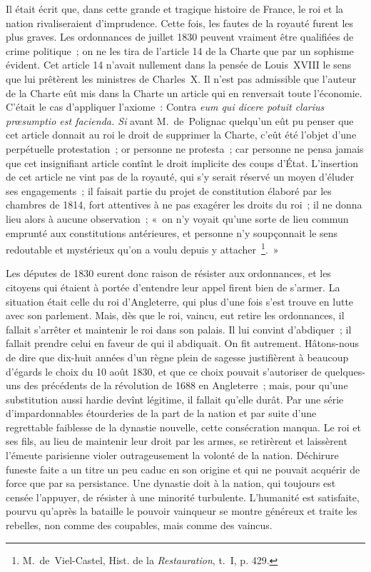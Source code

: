 \documentclass[french,twoside]{book} %
\begin{document}
Il était écrit que, dans cette grande et tragique histoire de France, le roi et la nation rivaliseraient d’imprudence. Cette fois, les fautes de la royauté furent les plus graves. Les ordonnances de juillet 1830 peuvent vraiment être qualifiées de crime politique ; on ne les tira de l’article 14 de la Charte que par un sophisme évident. Cet article 14 n’avait nullement dans la pensée de Louis XVIII le sens que lui prêtèrent les ministres de Charles X. Il n’est pas admissible que l’auteur de la Charte eût mis dans la Charte un article qui en renversait toute l’économie. C’était le cas d’appliquer l’axiome : Contra {\itshape eum qui dicere potuit clarius prœsumptio est facienda. Si} avant M. de Polignac quelqu’un eût pu penser que cet article donnait au roi le droit de supprimer la Charte, c’eût été l’objet d’une perpétuelle protestation ; or personne ne protesta ; car personne ne pensa jamais que cet insignifiant article contînt le droit implicite des coups d’État. L’insertion de cet article ne vint pas de la royauté, qui s’y serait réservé un moyen d’éluder ses engagements ; il faisait partie du projet de constitution élaboré par les chambres de 1814, fort attentives à ne pas exagérer les droits du roi ; il ne donna lieu alors à aucune observation ; « on n’y voyait qu’une sorte de lieu commun emprunté aux constitutions antérieures, et personne n’y soupçonnait le sens redoutable et mystérieux qu’on a voulu depuis y attacher \footnote{ M. de Viel-Castel, Hist. de la {\itshape Restauration}, t. I, p. 429.}. » \par
Les députes de 1830 eurent donc raison de résister aux ordonnances, et les citoyens qui étaient à portée d’entendre leur appel firent bien de s’armer. La situation était celle du roi d’Angleterre, qui plus d’une fois s’est trouve en lutte avec son parlement. Mais, dès que le roi, vaincu, eut retire les ordonnances, il fallait s’arrêter et maintenir le roi dans son palais. Il lui convint d’abdiquer ; il fallait prendre celui en faveur de qui il abdiquait. On fit autrement. Hâtons-nous de dire que dix-huit années d’un règne plein de sagesse justifièrent à beaucoup d’égards le choix du 10 août 1830, et que ce choix pouvait s’autoriser de quelques-uns des précédents de la révolution de 1688 en Angleterre ; mais, pour qu’une substitution aussi hardie devînt légitime, il fallait qu’elle durât. Par une série d’impardonnables étourderies de la part de la nation et par suite d’une regrettable faiblesse de la dynastie nouvelle, cette consécration manqua. Le roi et ses fils, au lieu de maintenir leur droit par les armes, se retirèrent et laissèrent l’émeute parisienne violer outrageusement la volonté de la nation. Déchirure funeste faite a un titre un peu caduc en son origine et qui ne pouvait acquérir de force que par sa persistance. Une dynastie doit à la nation, qui toujours est censée l’appuyer, de résister à une minorité turbulente. L’humanité est satisfaite, pourvu qu’après la bataille le pouvoir vainqueur se montre généreux et traite les rebelles, non comme des coupables, mais comme des vaincus.\par
\end{document}
